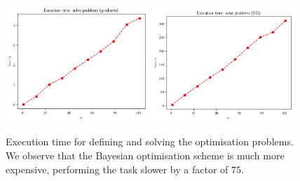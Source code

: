 \begin{figure}[ht]
    \begin{center}
      \includegraphics[width=0.48\textwidth]{./Thesis/images/chapter4/exec_solve_grad.png}
      \includegraphics[width=0.48\textwidth]{./Thesis/images/chapter4/exec_solve_bo.png}
    \end{center}
    \caption[Execution time for solving the optimisation problems.]{Execution time for defining and solving the optimisation
      problems. We observe that the Bayesian optimisation scheme is much more expensive, performing the task slower by a factor of $75$.}
  \label{fig:exec_solve}
\end{figure}

